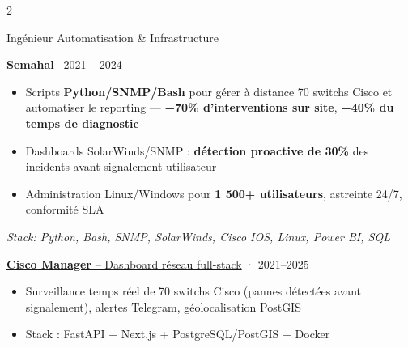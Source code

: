 \documentclass[7pt,a4paper,withhyper]{altacv}
\renewcommand{\cvevent}[4]{%
  {\large\color{emphasis}\raggedright #1\par}
  \smallskip\normalsize
  \ifstrequal{#2}{}{}{%
    \textbf{\color{accent}#2}%
  }%
  \ifstrequal{#4}{}{}{%
    \ifstrequal{#2}{}{}{\hspace{1.5em}}%
    {\small\cvLocationMarker~#4}%
  }%
  \ifstrequal{#3}{}{}{%
    \hfill{\small\cvDateMarker~#3}%
  }\par
}
\providecommand{\cvgithub}{github-username}
\begin{document}
\begin{paracol}{2}
\vspace{0.25em}\par\vspace{0.25em}

\cvevent{Ingénieur Automatisation \& Infrastructure}{Semahal}{2021 – 2024}{}
\smallskip
\begin{itemize}[leftmargin=1.25em, itemsep=0pt, parsep=0pt]
\item \justifying Scripts \textbf{Python/SNMP/Bash} pour gérer à distance 70 switchs Cisco et automatiser le reporting — \textbf{−70\% d'interventions sur site}, \textbf{−40\% du temps de diagnostic}
\item \justifying Dashboards SolarWinds/SNMP : \textbf{détection proactive de 30\%} des incidents avant signalement utilisateur
\item \justifying Administration Linux/Windows pour \textbf{1 500+ utilisateurs}, astreinte 24/7, conformité SLA
\end{itemize}
\smallskip\noindent\textit{Stack: Python, Bash, SNMP, SolarWinds, Cisco IOS, Linux, Power BI, SQL}\par

\vspace{-0.5ex}

{\large\color{emphasis}\raggedright\href{https://github.com/\cvgithub/cisco-manager}{\textbf{Cisco Manager} -- Dashboard réseau full-stack} {\small\color{LightGrey}· 2021–2025}\par}
\vspace{0.1em}
\begin{itemize}[leftmargin=1.25em, nosep]
\item \justifying Surveillance temps réel de 70 switchs Cisco (pannes détectées avant signalement), alertes Telegram, géolocalisation PostGIS
\item \justifying Stack : FastAPI + Next.js + PostgreSQL/PostGIS + Docker
\end{itemize}\par
\vspace{0.1em}\par\vspace{0.1em}


\end{paracol}
\end{document}
